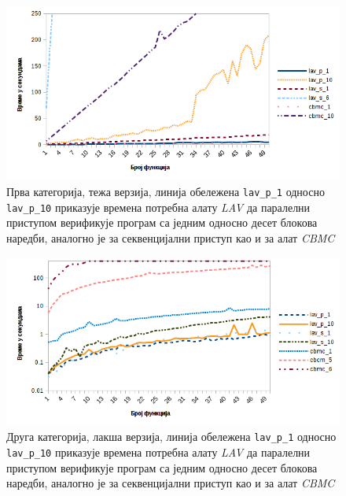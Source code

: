 \documentclass[12pt,oneside]{memoir}
\begin{document}
\begin{figure}[!ht]
  \centering
  \includegraphics[scale=0.8]{img/nivo1T_master.png}
  \caption{Прва категорија, тежа верзија, линија обележена \texttt{lav\_p\_1} односно \texttt{lav\_p\_10} приказује времена потребна алату \textit{LAV} да паралелни приступом верификује програм са једним односно десет блокова наредби, аналогно је за секвенцијални приступ као и за алат \textit{CBMC}}
  \label{fig:nivo_1t}
\end{figure}

\begin{figure}[!ht]
  \centering
  \includegraphics[scale=0.8]{img/nivo2_master.png}
  \caption{Друга категорија, лакша верзија, линија обележена \texttt{lav\_p\_1} односно \texttt{lav\_p\_10} приказује времена потребна алату \textit{LAV} да паралелни приступом верификује програм са једним односно десет блокова наредби, аналогно је за секвенцијални приступ као и за алат \textit{CBMC}}
  \label{fig:nivo_2}
\end{figure}
\end{document}
